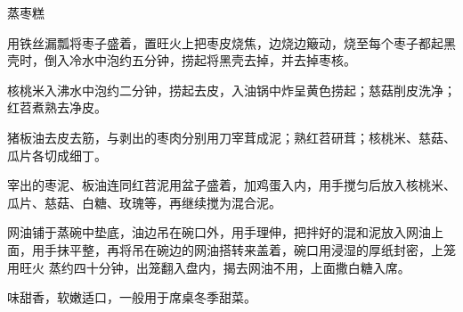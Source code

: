 \begin{recipe}{蒸枣糕}

\ingredients


\preparation

\step 用铁丝漏瓢将枣子盛着，置旺火上把枣皮烧焦，边烧边簸动，烧至每个枣子都起黑
壳时，倒入冷水中泡约五分钟，捞起将黑壳去掉，并去掉枣核。

\step 核桃米入沸水中泡约二分钟，捞起去皮，入油锅中炸呈黄色捞起；慈菇削皮洗净；
红苕煮熟去净皮。

\step 猪板油去皮去筋，与剥出的枣肉分别用刀宰茸成泥；熟红苕研茸；核桃米、慈菇、
瓜片各切成细丁。

\step 宰出的枣泥、板油连同红苕泥用盆子盛着，加鸡蛋入内，用手搅匀后放入核桃米、
瓜片、慈菇、白糖、玫瑰等，再继续搅为混合泥。

\step 网油铺于蒸碗中垫底，油边吊在碗口外，用手理伸，把拌好的混和泥放入网油上
面，用手抹平整，再将吊在碗边的网油搭转来盖着，碗口用浸湿的厚纸封密，上笼用旺火
蒸约四十分钟，出笼翻入盘内，揭去网油不用，上面撒白糖入席。

\features

味甜香，软嫩适口，一般用于席桌冬季甜菜。

\end{recipe}

